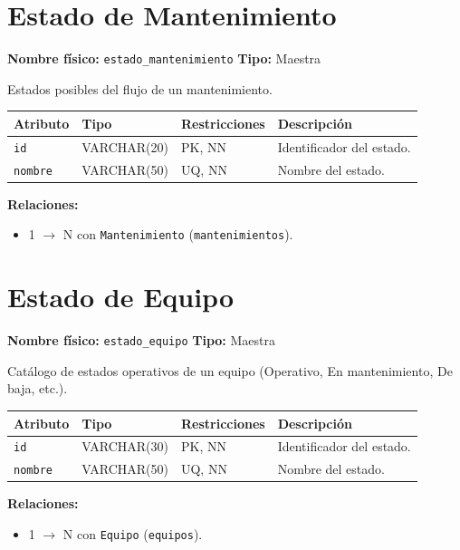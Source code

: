 \documentclass[12pt,a4paper]{article}
\newenvironment{tabladesc}[3]{%
  \section{#1}
  \textbf{Nombre físico:} \texttt{#2} \hfill \textbf{Tipo:} #3\par
  \medskip
}{%
  \bigskip
}
\begin{document}
\begin{tabladesc}{Estado de Mantenimiento}{estado\_mantenimiento}{Maestra}

Estados posibles del flujo de un mantenimiento.

\bigskip
\begin{longtable}{L{3.5cm} L{2cm} L{1.8cm} L{8cm}}
\toprule
\textbf{Atributo} & \textbf{Tipo} & \textbf{Restricciones} & \textbf{Descripción} \\
\midrule
\endhead
\bottomrule
\endfoot
\texttt{id}     & VARCHAR(20) & PK, NN & Identificador del estado. \\
\texttt{nombre} & VARCHAR(50) & UQ, NN & Nombre del estado. \\
\bottomrule
\end{longtable}

\textbf{Relaciones:}
\begin{itemize}[nosep]
  \item 1 $\rightarrow$ N con \texttt{Mantenimiento} (\texttt{mantenimientos}).
\end{itemize}
\end{tabladesc}

\begin{tabladesc}{Estado de Equipo}{estado\_equipo}{Maestra}

Catálogo de estados operativos de un equipo (Operativo, En mantenimiento, De baja, etc.).

\bigskip
\begin{longtable}{L{3.5cm} L{2cm} L{1.8cm} L{8cm}}
\toprule
\textbf{Atributo} & \textbf{Tipo} & \textbf{Restricciones} & \textbf{Descripción} \\
\midrule
\endhead
\bottomrule
\endfoot
\texttt{id}     & VARCHAR(30) & PK, NN & Identificador del estado. \\
\texttt{nombre} & VARCHAR(50) & UQ, NN & Nombre del estado. \\
\bottomrule
\end{longtable}

\textbf{Relaciones:}
\begin{itemize}[nosep]
  \item 1 $\rightarrow$ N con \texttt{Equipo} (\texttt{equipos}).
\end{itemize}
\end{tabladesc}
\end{document}
